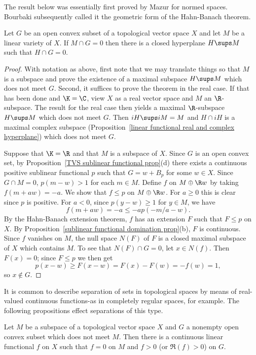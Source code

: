 The result below was essentially first proved by Mazur for normed spaces. Bourbaki subsequently called it the geometric form of the Hahn-Banach theorem.
\begin{theorem}\label{Hahn-Banach geometric form}
Let $G$ be an open convex subset of a topological vector space $X$ and let $M$ be a linear variety of $X$. If $M\cap G=0$ then there is a closed hyperplane $H\sups M$ such that $H\cap G=0$.
\end{theorem}
\begin{proof}
With notation as above, first note that we may translate things so that $M$ is a subspace and prove the existence of a maximal subspace $H\sups M$ which does not meet $G$. Second, it suffices to prove the theorem in the real case. If that has been done and $\K=\C$, view $X$ as a real vector space and $M$ an $\R$-subspace. The result for the real case then yields a maximal $\R$-subspace $H\sups M$ which does not meet $G$. Then $iH\sups iM=M$ and $H\cap iH$ is a maximal complex subspace (Proposition~\ref{linear functional real and complex hyperplane}) which does not meet $G$.\par
Suppose that $\K=\R$ and that $M$ is a subspace of $X$. Since $G$ is an open convex set, by Proposition~\ref{TVS sublinear functional prop}(d) there exists a continuous positive sublinear functional $p$ such that $G=w+B_p$ for some $w\in X$. Since $G\cap M=0$, $p(m-w)>1$ for each $m\in M$. Define $f$ on $M\oplus\R w$ by taking $f(m+aw)=-a$. We show that $f\leq p$ on $M\oplus\R w$. For $a\geq 0$ this is clear since $p$ is positive. For $a<0$, since $p(y-w)\geq 1$ for $y\in M$, we have
\[f(m+aw)=-a\leq-ap(-m/a-w).\]
By the Hahn-Banach extension theorem, $f$ has an extension $F$ such that $F\leq p$ on $X$. By Proposition~\ref{sublinear functional domination prop}(b), $F$ is continuous. Since $f$ vanishes on $M$, the null space $N(F)$ of $F$ is a closed maximal subspace of $X$ which contains $M$. To see that $N(F)\cap G=0$, let $x\in N(f)$. Then $F(x)=0$; since $F\leq p$ we then get
\[p(x-w)\geq F(x-w)=F(x)-F(w)=-f(w)=1,\]
so $x\notin G$.
\end{proof}
It is common to describe separation of sets in topological spaces by means of real-valued continuous functions-as in completely regular spaces, for example. The following propositions effect separations of this type.
\begin{proposition}\label{TVS separation of open convex with subspace}
Let $M$ be a subspace of a topological vector space $X$ and $G$ a nonempty open convex subset which does not meet $M$. Then there is a continuous linear functional $f$ on $X$ such that $f=0$ on $M$ and $f>0$ (or $\Re(f)>0$) on $G$.
\end{proposition}
